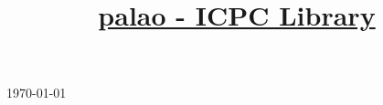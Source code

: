 \documentclass[10pt,a4paper]{article}
\title{\vspace{-5ex}\Large{\underline{
  palao - ICPC Library
}}}
\author{}
\date{}
\begin{document}
\begin{landscape}
\begin{multicols*}{2}  %
\raggedcolumns 
{}

\maketitle
\vspace{-13ex}
{\tiny\today} \vspace{-3ex}
\tableofcontents
\pagestyle{fancy}



\end{multicols*}
\end{landscape}
\end{document}
